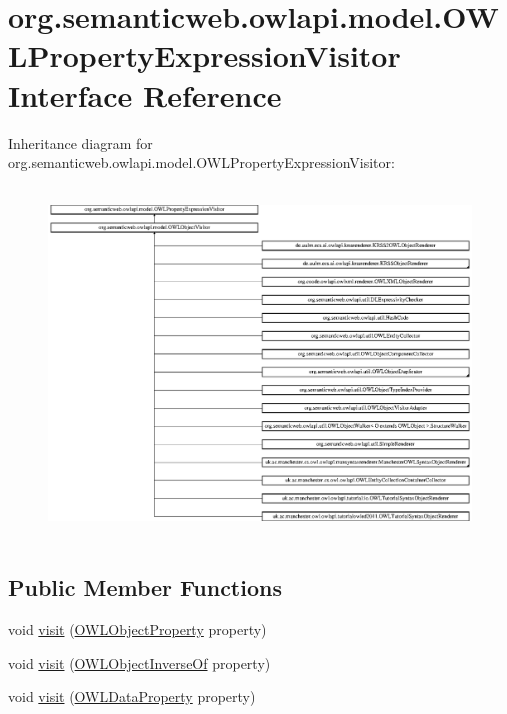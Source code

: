 \hypertarget{interfaceorg_1_1semanticweb_1_1owlapi_1_1model_1_1_o_w_l_property_expression_visitor}{\section{org.\-semanticweb.\-owlapi.\-model.\-O\-W\-L\-Property\-Expression\-Visitor Interface Reference}
\label{interfaceorg_1_1semanticweb_1_1owlapi_1_1model_1_1_o_w_l_property_expression_visitor}
}
Inheritance diagram for org.\-semanticweb.\-owlapi.\-model.\-O\-W\-L\-Property\-Expression\-Visitor\-:\begin{figure}[H]
\begin{center}
\leavevmode
\includegraphics[height=9.333334cm]{interfaceorg_1_1semanticweb_1_1owlapi_1_1model_1_1_o_w_l_property_expression_visitor}
\end{center}
\end{figure}
\subsection*{Public Member Functions}
\begin{DoxyCompactItemize}
\item 
void \hyperlink{interfaceorg_1_1semanticweb_1_1owlapi_1_1model_1_1_o_w_l_property_expression_visitor_aa1be3855d0fefa8a2680ca4cc1d50ec5}{visit} (\hyperlink{interfaceorg_1_1semanticweb_1_1owlapi_1_1model_1_1_o_w_l_object_property}{O\-W\-L\-Object\-Property} property)
\item 
void \hyperlink{interfaceorg_1_1semanticweb_1_1owlapi_1_1model_1_1_o_w_l_property_expression_visitor_a6169560e37cc44c3d1df3cf34fea422f}{visit} (\hyperlink{interfaceorg_1_1semanticweb_1_1owlapi_1_1model_1_1_o_w_l_object_inverse_of}{O\-W\-L\-Object\-Inverse\-Of} property)
\item 
void \hyperlink{interfaceorg_1_1semanticweb_1_1owlapi_1_1model_1_1_o_w_l_property_expression_visitor_a10fe3cc76b091a64635f26e128092731}{visit} (\hyperlink{interfaceorg_1_1semanticweb_1_1owlapi_1_1model_1_1_o_w_l_data_property}{O\-W\-L\-Data\-Property} property)
\end{DoxyCompactItemize}



